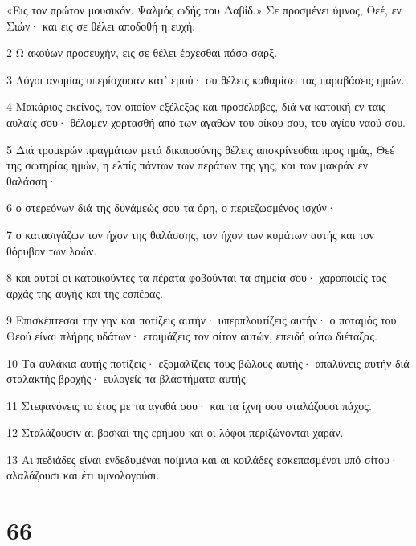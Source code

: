 \par «Εις τον πρώτον μουσικόν. Ψαλμός ωδής του Δαβίδ.» Σε προσμένει ύμνος, Θεέ, εν Σιών· και εις σε θέλει αποδοθή η ευχή.
\par 2 Ω ακούων προσευχήν, εις σε θέλει έρχεσθαι πάσα σαρξ.
\par 3 Λόγοι ανομίας υπερίσχυσαν κατ' εμού· συ θέλεις καθαρίσει τας παραβάσεις ημών.
\par 4 Μακάριος εκείνος, τον οποίον εξέλεξας και προσέλαβες, διά να κατοική εν ταις αυλαίς σου· θέλομεν χορτασθή από των αγαθών του οίκου σου, του αγίου ναού σου.
\par 5 Διά τρομερών πραγμάτων μετά δικαιοσύνης θέλεις αποκρίνεσθαι προς ημάς, Θεέ της σωτηρίας ημών, η ελπίς πάντων των περάτων της γης, και των μακράν εν θαλάσση·
\par 6 ο στερεόνων διά της δυνάμεώς σου τα όρη, ο περιεζωσμένος ισχύν·
\par 7 ο κατασιγάζων τον ήχον της θαλάσσης, τον ήχον των κυμάτων αυτής και τον θόρυβον των λαών.
\par 8 και αυτοί οι κατοικούντες τα πέρατα φοβούνται τα σημεία σου· χαροποιείς τας αρχάς της αυγής και της εσπέρας.
\par 9 Επισκέπτεσαι την γην και ποτίζεις αυτήν· υπερπλουτίζεις αυτήν· ο ποταμός του Θεού είναι πλήρης υδάτων· ετοιμάζεις τον σίτον αυτών, επειδή ούτω διέταξας.
\par 10 Τα αυλάκια αυτής ποτίζεις· εξομαλίζεις τους βώλους αυτής· απαλύνεις αυτήν διά σταλακτής βροχής· ευλογείς τα βλαστήματα αυτής.
\par 11 Στεφανόνεις το έτος με τα αγαθά σου· και τα ίχνη σου σταλάζουσι πάχος.
\par 12 Σταλάζουσιν αι βοσκαί της ερήμου και οι λόφοι περιζώνονται χαράν.
\par 13 Αι πεδιάδες είναι ενδεδυμέναι ποίμνια και αι κοιλάδες εσκεπασμέναι υπό σίτου· αλαλάζουσι και έτι υμνολογούσι.

\chapter{66}

